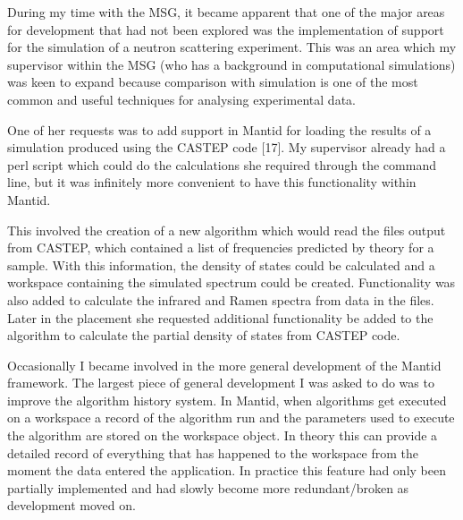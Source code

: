 \documentclass[paper=a4, fontsize=11pt]{scrartcl}	%
\numberwithin{equation}{section}															%
\numberwithin{figure}{section}																%
\numberwithin{table}{section}
\begin{document}
During my time with the MSG, it became apparent that one of the major
areas for development that had not been explored was the implementation
of support for the simulation of a neutron scattering experiment. This
was an area which my supervisor within the MSG (who has a background in computational
simulations) was keen to expand because comparison with simulation is
one of the most common and useful techniques for analysing experimental
data.

One of her requests was to add support in Mantid for loading the results
of a simulation produced using the CASTEP code {[}17{]}. My supervisor
already had a perl script which could do the calculations she required
through the command line, but it was infinitely more convenient to have
this functionality within Mantid.

This involved the creation of a new algorithm which would read the files
output from CASTEP, which contained a list of frequencies predicted by
theory for a sample. With this information, the density of states could
be calculated and a workspace containing the simulated spectrum could be
created. Functionality was also added to calculate the infrared and
Ramen spectra from data in the files. Later in the placement she requested additional functionality be added to the algorithm to
calculate the partial density of states from CASTEP code.


Occasionally I became involved in the more general development of the
Mantid framework. The largest piece of general development I was asked
to do was to improve the algorithm history system. In Mantid, when
algorithms get executed on a workspace a record of the algorithm run and
the parameters used to execute the algorithm are stored on the workspace
object. In theory this can provide a detailed record of everything that
has happened to the workspace from the moment the data entered the
application. In practice this feature had only been partially
implemented and had slowly become more redundant/broken as development
moved on.
\end{document}
